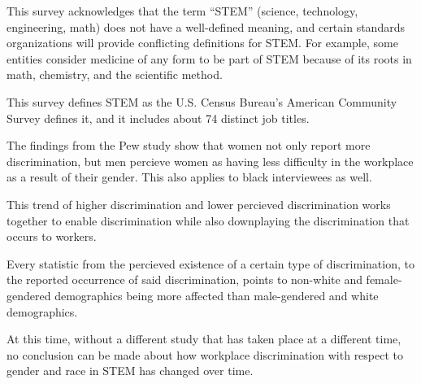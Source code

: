 \documentclass[a4paper,12pt]{article}
\begin{document}
	This survey acknowledges that the term ``STEM'' (science, technology, engineering, math) does not have a well-defined meaning, and certain standards organizations will provide conflicting definitions for STEM. For example, some entities consider medicine of any form to be part of STEM because of its roots in math, chemistry, and the scientific method.

	This survey %
defines STEM as the  U.S. Census Bureau’s American Community Survey defines it, and it includes about 74 distinct job titles.

	The findings from the Pew study show that women not only report more discrimination, 
but men percieve women as having less difficulty in the workplace as a result of their gender. 
This also applies to black interviewees as well.

	This trend of higher discrimination and lower percieved discrimination works together to enable
discrimination %
 while also downplaying the discrimination that occurs to workers.

	Every statistic from the percieved existence of a certain type of discrimination, to the reported occurrence
of said discrimination, points to non-white and female-gendered demographics being more affected than 
male-gendered and white demographics.

	At this time, without a different study that has taken place at a different time, no conclusion can
be made about how workplace discrimination with respect to gender and race in STEM has changed over time.



\newpage
\singlespacing
\end{document}
